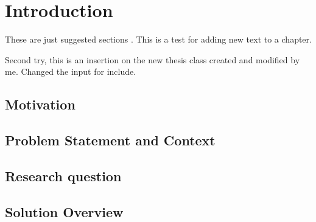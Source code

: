 \chapter{Introduction}
\label{chapter:chapter01}

These are just suggested sections \cite{greenwade93}. This is a test for adding new text to a chapter.

Second try, this is an insertion on the new thesis class created and modified by me. Changed the input for include. 

\section{Motivation}

\section{Problem Statement and Context}

\section{Research question}

\section{Solution Overview}
